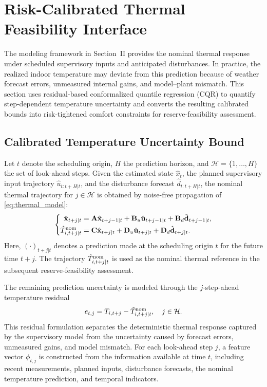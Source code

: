 \documentclass[journal]{IEEEtran}
\theoremstyle{remark}
\begin{document}
	\section{Risk-Calibrated Thermal Feasibility Interface}
	\label{sec:uncertainty}
	
	The modeling framework in Section~II provides the nominal thermal response under scheduled supervisory inputs and anticipated disturbances. In practice, the realized indoor temperature may deviate from this prediction because of weather forecast errors, unmeasured internal gains, and model--plant mismatch. This section uses residual-based conformalized quantile regression (CQR) \cite{Romano2019CQR} to quantify step-dependent temperature uncertainty and converts the resulting calibrated bounds into risk-tightened comfort constraints for reserve-feasibility assessment.
	
	\subsection{Calibrated Temperature Uncertainty Bound}
	
	Let \(t\) denote the scheduling origin, \(H\) the prediction horizon, and \(\mathcal{H}=\{1,\ldots,H\}\) the set of look-ahead steps. Given the estimated state $\hat x_t$, the planned supervisory input trajectory $\hat u_{t:t+H|t}$, and the disturbance forecast $\hat d_{t:t+H|t}$, the nominal thermal
	trajectory for \(j\in\mathcal H\) is obtained by noise-free propagation of \eqref{eq:thermal_model}:
	\begin{equation}
		\left\{
		\begin{aligned}
			\hat{\mathbf{x}}_{t+j|t}
			&=
			\mathbf{A}\hat{\mathbf{x}}_{t+j-1|t}
			+
			\mathbf{B}_{u}\hat{\mathbf{u}}_{t+j-1|t}
			+
			\mathbf{B}_{d}\hat{\mathbf{d}}_{t+j-1|t},\\
			\hat T^{\rm nom}_{i,t+j|t}
			&=
			\mathbf{C}\hat{\mathbf{x}}_{t+j|t}
			+
			\mathbf{D}_{u}\hat{\mathbf{u}}_{t+j|t}
			+
			\mathbf{D}_{d}\hat{\mathbf{d}}_{t+j|t}.
		\end{aligned}
		\right.
		\label{eq:nominal_prediction}
	\end{equation}
	Here, \((\cdot)_{t+j|t}\) denotes a prediction made at the scheduling
	origin \(t\) for the future time \(t+j\). The trajectory
	\(\hat T^{\rm nom}_{i,t+j|t}\) is used as the nominal thermal reference
	in the subsequent reserve-feasibility assessment.
	
	The remaining prediction uncertainty is modeled through the
	\(j\)-step-ahead temperature residual
	\begin{equation}
		e_{t,j}
		=
		T_{i,t+j}
		-
		\hat T^{\rm nom}_{i,t+j|t},
		\quad j\in\mathcal H .
		\label{eq:temperature_residual}
	\end{equation}
	This residual formulation separates the deterministic thermal response
	captured by the supervisory model from the uncertainty caused by
	forecast errors, unmeasured gains, and model mismatch. For each
	look-ahead step \(j\), a feature vector \(\phi_{t,j}\) is constructed
	from the information available at time \(t\), including recent
	measurements, planned inputs, disturbance forecasts, the nominal
	temperature prediction, and temporal indicators.
	
\end{document}
